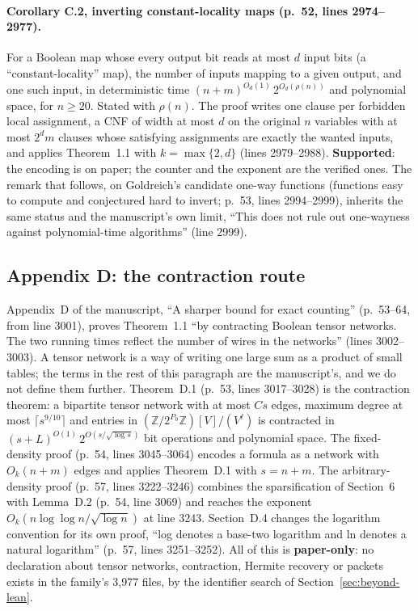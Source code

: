\paragraph{Corollary C.2, inverting constant-locality maps (p.~52, lines 2974--2977).}
For a Boolean map whose every output bit reads at most $d$ input bits (a ``constant-locality'' map), the number of inputs mapping to a given output, and one such input, in
deterministic time $(n+m)^{O_d(1)}\,2^{O_d(\rho(n))}$ and polynomial
space, for $n \ge 20$. Stated with $\rho(n)$. The proof writes one
clause per forbidden local assignment, a CNF of width at most $d$ on the
original $n$ variables with at most $2^d m$ clauses whose satisfying
assignments are exactly the wanted inputs, and applies Theorem~1.1 with
$k = \max\{2, d\}$ (lines 2979--2988). \textbf{Supported}: the encoding
is on paper; the counter and the exponent are the verified ones. The remark that follows, on Goldreich's candidate one-way functions (functions easy to compute and conjectured hard to invert; p.~53, lines 2994--2999), inherits the same status and the manuscript's own
limit, ``This does not rule out one-wayness against polynomial-time
algorithms'' (line 2999).

\subsection{Appendix D: the contraction route}
\label{sec:beyond-appendix-d}

Appendix~D of the manuscript, ``A sharper bound for exact counting''
(p.~53--64, from line 3001), proves Theorem~1.1 ``by contracting Boolean tensor networks. The two running times reflect the number of wires in the networks'' (lines 3002--3003). A tensor network is a way of writing one large sum as a product of small tables; the terms in the rest of this paragraph are the manuscript's, and we do not define them further. Theorem~D.1 (p.~53, lines
3017--3028) is the contraction theorem: a bipartite tensor network with
at most $Cs$ edges, maximum degree at most $\lceil s^{9/10}\rceil$ and
entries in $(\mathbb{Z}/2^{P_0}\mathbb{Z})[V]/(V^\ell)$ is contracted in
$(s+L)^{O(1)}\,2^{O(s/\sqrt{\log s})}$ bit operations and polynomial
space. The fixed-density proof (p.~54, lines 3045--3064) encodes a
formula as a network with $O_k(n+m)$ edges and applies Theorem~D.1 with
$s = n + m$. The arbitrary-density proof (p.~57, lines 3222--3246)
combines the sparsification of Section~6 with Lemma~D.2 (p.~54, line
3069) and reaches the exponent $O_k(n\log\log n/\sqrt{\log n})$ at line
3243. Section~D.4 changes the logarithm convention for its own proof,
``log denotes a base-two logarithm and ln denotes a natural logarithm''
(p.~57, lines 3251--3252). All of this is \textbf{paper-only}: no
declaration about tensor networks, contraction, Hermite recovery or
packets exists in the family's 3,977 files, by the identifier search of
Section~\ref{sec:beyond-lean}.

